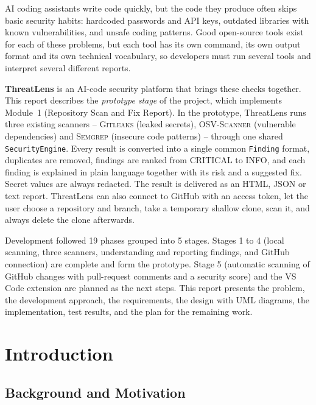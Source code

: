 \documentclass[12pt,a4paper]{article}
\newcommand{\tool}[1]{\textsc{#1}}
\begin{document}
AI coding assistants write code quickly, but the code they produce often skips basic security habits: hardcoded passwords and API keys, outdated libraries with known vulnerabilities, and unsafe coding patterns. Good open-source tools exist for each of these problems, but each tool has its own command, its own output format and its own technical vocabulary, so developers must run several tools and interpret several different reports.

\textbf{ThreatLens} is an AI-code security platform that brings these checks together. This report describes the \emph{prototype stage} of the project, which implements Module~1 (Repository Scan and Fix Report). In the prototype, ThreatLens runs three existing scanners -- \tool{Gitleaks} (leaked secrets), \tool{OSV-Scanner} (vulnerable dependencies) and \tool{Semgrep} (insecure code patterns) -- through one shared \texttt{SecurityEngine}. Every result is converted into a single common \texttt{Finding} format, duplicates are removed, findings are ranked from CRITICAL to INFO, and each finding is explained in plain language together with its risk and a suggested fix. Secret values are always redacted. The result is delivered as an HTML, JSON or text report. ThreatLens can also connect to GitHub with an access token, let the user choose a repository and branch, take a temporary shallow clone, scan it, and always delete the clone afterwards.

Development followed 19 phases grouped into 5 stages. Stages 1 to 4 (local scanning, three scanners, understanding and reporting findings, and GitHub connection) are complete and form the prototype. Stage 5 (automatic scanning of GitHub changes with pull-request comments and a security score) and the VS Code extension are planned as the next steps. This report presents the problem, the development approach, the requirements, the design with UML diagrams, the implementation, test results, and the plan for the remaining work.

\clearpage
\tableofcontents
\clearpage
\listoffigures
\listoftables
\clearpage
{}

\section{Introduction}

\subsection{Background and Motivation}
\end{document}
